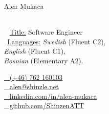 \begin{minipage}[t]{0.4\textwidth}
    \vspace{0pt} %
    {\par\centering\huge{Alen Mukaca}} \\[0.3cm]

    {\small
    \faGraduationCap~ \underline{Title:} Software Engineer \\
    \faCommentsO~\underline{Languages:} \emph{Swedish} (Fluent C2), \\ \emph{English} (Fluent C1), \\ \emph{Bosnian} (Elementary A2).}
\end{minipage}\hfill
\begin{minipage}[t]{0.55\textwidth}
    \vspace{0pt} %
    \href{tel:+46762160103}{\faPhone~ (+46) 762 160103} \\
    \href{mailto:alen@shinzle.net}{\faEnvelopeO~ \protect alen@shinzle.net} \\[0.1cm]

    \href{https://linkedin.com/in/alen-mukaca/}{\faLinkedin~ \protect linkedin.com/in/alen-mukaca} \\
    \href{https://github.com/ShinzenATT}{\faGithub~ \protect github.com/ShinzenATT} \\
\end{minipage}
